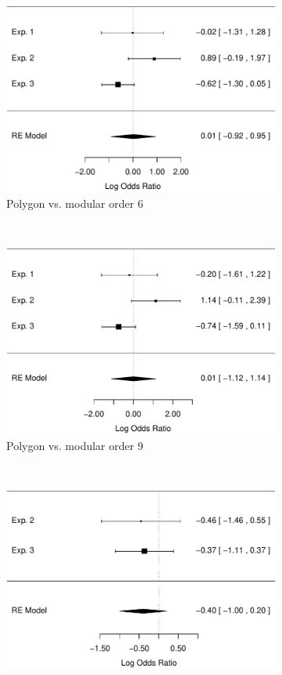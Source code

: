 \documentclass[man,10pt]{apa6}
\begin{document}
\begin{figure}[t]
\centering
\begin{subfigure}[c]{0.4\textwidth}
\centering
\includegraphics[width=\textwidth]{figures/meta/conditionpolygon.pdf}
\caption{Polygon vs. modular order 6}
\end{subfigure}
~
\begin{subfigure}[c]{0.4\textwidth}
\centering
\includegraphics[width=\textwidth]{figures/meta/question_typeoperation_9_conditionpolygon.pdf}
\caption{Polygon vs. modular order 9}
\end{subfigure} \\
\centering
\begin{subfigure}[c]{0.4\textwidth}
\centering
\includegraphics[width=\textwidth]{figures/meta/conditionhybrid.pdf}

\end{subfigure}
\end{figure}
\end{document}
